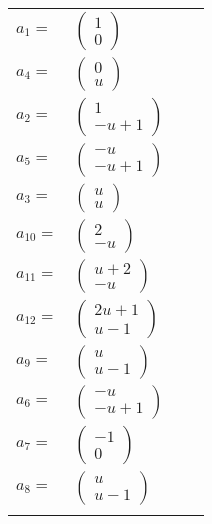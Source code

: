 \documentclass[1p]{elsarticle_modified}
\theoremstyle{definition}
\begin{document}
\begin{tabular}{m{7pt} m{180pt} m{7pt} m{180pt} }
\flushright $a_{1}=$&$\begin{pmatrix}1\\0\end{pmatrix}$ \\
\flushright $a_{4}=$&$\begin{pmatrix}0\\u\end{pmatrix}$ \\
\flushright $a_{2}=$&$\begin{pmatrix}1\\- u+1\end{pmatrix}$ \\
\flushright $a_{5}=$&$\begin{pmatrix}- u\\- u+1\end{pmatrix}$ \\
\flushright $a_{3}=$&$\begin{pmatrix}u\\u\end{pmatrix}$ \\
\flushright $a_{10}=$&$\begin{pmatrix}2\\- u\end{pmatrix}$ \\
\flushright $a_{11}=$&$\begin{pmatrix}u+2\\- u\end{pmatrix}$ \\
\flushright $a_{12}=$&$\begin{pmatrix}2 u+1\\u-1\end{pmatrix}$ \\
\flushright $a_{9}=$&$\begin{pmatrix}u\\u-1\end{pmatrix}$ \\
\flushright $a_{6}=$&$\begin{pmatrix}- u\\- u+1\end{pmatrix}$ \\
\flushright $a_{7}=$&$\begin{pmatrix}-1\\0\end{pmatrix}$ \\
\flushright $a_{8}=$&$\begin{pmatrix}u\\u-1\end{pmatrix}$\\&\end{tabular}
\end{document}
